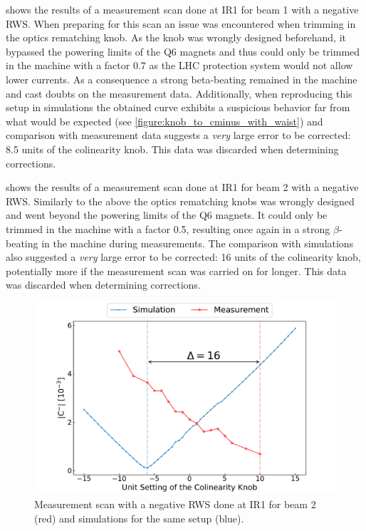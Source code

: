  shows the results of a measurement scan done at IR\num{1} for beam \num{1} with a negative RWS.
When preparing for this scan an issue was encountered when trimming in the optics rematching knob.
As the knob was wrongly designed beforehand, it bypassed the powering limits of the Q\num{6} magnets and thus could only be trimmed in the machine with a factor \num{0.7} as the LHC protection system would not allow lower currents.
As a consequence a strong \gls{beta-beating} remained in the machine and cast doubts on the measurement data. 
Additionally, when reproducing this setup in simulations the obtained  curve exhibits a suspicious behavior far from what would be expected (see \cref{figure:knob_to_cminus_with_waist}) and comparison with measurement data suggests a \textit{very} large error to be corrected: \num{8.5} units of the colinearity knob.
This data was discarded when determining corrections.

 shows the results of a measurement scan done at IR\num{1} for beam \num{2} with a negative RWS.
Similarly to the above the optics rematching knobs was wrongly designed and went beyond the powering limits of the Q\num{6} magnets.
It could only be trimmed in the machine with a factor \num{0.5}, resulting once again in a strong \(\beta\)-beating in the machine during measurements.
The comparison with simulations also suggested a \textit{very} large error to be corrected: \num{16} units of the colinearity knob, potentially more if the measurement scan was carried on for longer.
This data was discarded when determining corrections.

\begin{figure}[!htb]
    \centering
    \includegraphics*[width=\textwidth]{Figures/Appendices/rws_measurement_ir1_b2_neg.pdf}
    \caption{Measurement scan with a negative RWS done at IR\num{1} for beam \num{2} (\textcolor{mplr}{red}) and simulations for the same setup (\textcolor{mplblue}{blue}).}
    \label{figure:ir1_b2_neg_measurement}
\end{figure}


